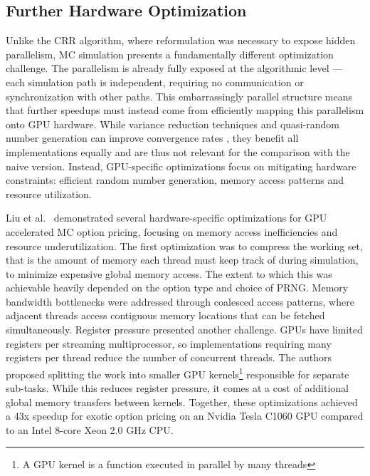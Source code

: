 \documentclass[english,12pt,a4paper,pdftex,sci,utf8]{aaltothesis}
\begin{document}
\subsection{Further Hardware Optimization}
Unlike the CRR algorithm, where reformulation was necessary to expose hidden parallelism, MC simulation presents a fundamentally different optimization challenge. The parallelism is already fully exposed at the algorithmic level --- each simulation path is independent, requiring no communication or synchronization with other paths. This embarrassingly parallel structure means that further speedups must instead come from efficiently mapping this parallelism onto GPU hardware. While variance reduction techniques and quasi-random number generation can improve convergence rates \cite{clewlow1998implementing}, they benefit all implementations equally and are thus not relevant for the comparison with the naive version. Instead, GPU-specific optimizations focus on mitigating hardware constraints: efficient random number generation, memory access patterns and resource utilization. 

Liu et al.\ \cite{liu2010efficient} demonstrated several hardware-specific optimizations for GPU accelerated MC option pricing, focusing on memory access inefficiencies and resource underutilization. The first optimization was to compress the working set, that is the amount of memory each thread must keep track of during simulation, to minimize expensive global memory access. The extent to which this was achievable heavily depended on the option type and choice of PRNG. Memory bandwidth bottlenecks were addressed through coalesced access patterns, where adjacent threads access contiguous memory locations that can be fetched simultaneously. Register pressure presented another challenge. GPUs have limited registers per streaming multiprocessor, so implementations requiring many registers per thread reduce the number of concurrent threads. The authors proposed splitting the work into smaller GPU kernels\footnote{A GPU kernel is a function executed in parallel by many threads} responsible for separate sub-tasks. While this reduces register pressure, it comes at a cost of additional global memory transfers between kernels. Together, these optimizations achieved a 43x speedup for exotic option pricing on an Nvidia Tesla C1060 GPU compared to an Intel 8-core Xeon 2.0 GHz CPU.
\end{document}
